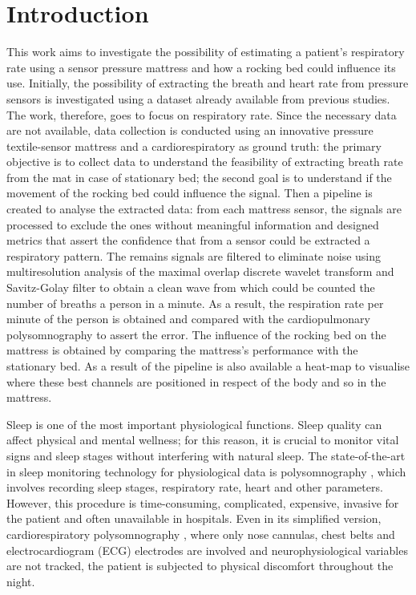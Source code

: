 
\chapter{Introduction}


This work aims to investigate the possibility of estimating a patient's respiratory rate using a sensor pressure mattress and how a rocking bed could influence its use. 
Initially, the possibility of extracting the breath and heart rate from pressure sensors is investigated using a dataset already available from previous studies. 
The work, therefore, goes to focus on respiratory rate. Since the necessary data are not available, data collection is conducted using an innovative pressure textile-sensor mattress and a cardiorespiratory as ground truth: the primary objective is to collect data to understand the feasibility of extracting breath rate from the mat in case of stationary bed; the second goal is to understand if the movement of the rocking bed could influence the signal. 
Then a pipeline is created to analyse the extracted data: from each mattress sensor, the signals are processed to exclude the ones without meaningful information and designed metrics that assert the confidence that from a sensor could be extracted a respiratory pattern. The remains signals are filtered to eliminate noise using multiresolution analysis of the maximal overlap discrete wavelet transform and Savitz-Golay filter to obtain a clean wave from which could be counted the number of breaths a person in a minute. As a result, the respiration rate per minute of the person is obtained and compared with the cardiopulmonary polysomnography to assert the error. The influence of the rocking bed on the mattress is obtained by comparing the mattress's performance with the stationary bed. As a result of the pipeline is also available a heat-map to visualise where these best channels are positioned in respect of the body and so in the mattress.

\newpage

Sleep is one of the most important physiological functions. Sleep quality can affect physical and mental wellness; for this reason, it is crucial to monitor vital signs and sleep stages without interfering with natural sleep. 
The state-of-the-art in sleep monitoring technology for physiological data is polysomnography \cite{Penzel2016ModulationsPolysomnography}, which involves recording sleep stages, respiratory rate, heart and other parameters. However, this procedure is time-consuming, complicated, expensive, invasive for the patient and often unavailable in hospitals. Even in its simplified version, cardiorespiratory polysomnography \cite{CallejaComparisonApnoea}, where only nose cannulas, chest belts and electrocardiogram (ECG) electrodes are involved and neurophysiological variables are not tracked, the patient is subjected to physical discomfort throughout the night.

